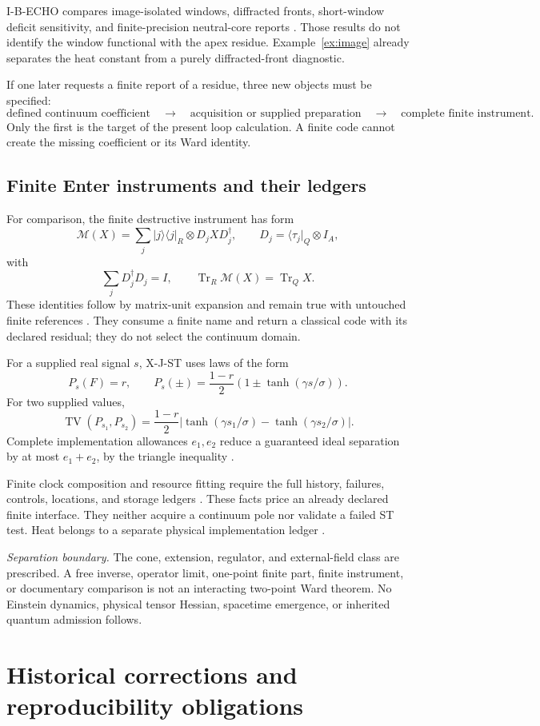 \documentclass[11pt,a4paper]{article}
\newcommand{\abs}[1]{\lvert #1\rvert}
\newcommand{\bra}[1]{\langle #1\rvert}
\newcommand{\proj}[1]{\lvert #1\rangle\langle #1\rvert}
\DeclareMathOperator{\Tr}{Tr}
\DeclareMathOperator{\TV}{TV}
\theoremstyle{plain}
\theoremstyle{definition}
\theoremstyle{remark}
\numberwithin{equation}{section}
\newcommand{\separation}{%
\par\smallskip\noindent
\emph{Separation boundary.}
The cone, extension, regulator, and external-field class are prescribed.
A free inverse, operator limit, one-point finite part, finite instrument,
or documentary comparison is not an interacting two-point Ward theorem.
No Einstein dynamics, physical tensor Hessian, spacetime emergence,
or inherited quantum admission follows.
}
\begin{document}
I-B-ECHO compares image-isolated windows, diffracted fronts,
short-window deficit sensitivity, and finite-precision neutral-core
reports \cite{CheungEcho}.
Those results do not identify the window functional with the apex
residue. Example~\ref{ex:image} already separates the heat constant
from a purely diffracted-front diagnostic.

If one later requests a finite report of a residue, three new
objects must be specified:
\[
\text{defined continuum coefficient}
\quad\longrightarrow\quad
\text{acquisition or supplied preparation}
\quad\longrightarrow\quad
\text{complete finite instrument}.
\]
Only the first is the target of the present loop calculation.
A finite code cannot create the missing coefficient or its Ward
identity.

\subsection{Finite Enter instruments and their ledgers}

For comparison, the finite destructive instrument has form
\[
\mathcal M(X)=
\sum_j\proj j_R\otimes D_jXD_j^\dagger,\qquad
D_j=\bra{\tau_j}_Q\otimes I_A,
\]
with
\[
\sum_jD_j^\dagger D_j=I,\qquad
\Tr_R\mathcal M(X)=\Tr_QX.
\]
These identities follow by matrix-unit expansion and remain true
with untouched finite references
\cite{CheungIB,CheungEn09}.
They consume a finite name and return a classical code with its
declared residual; they do not select the continuum domain.

For a supplied real signal \(s\), X-J-ST uses laws of the form
\[
P_s(F)=r,\qquad
P_s(\pm)=\frac{1-r}{2}
 \left(1\pm\tanh(\gamma s/\sigma)\right).
\]
For two supplied values,
\[
\TV(P_{s_1},P_{s_2})
 =\frac{1-r}{2}
 \abs{\tanh(\gamma s_1/\sigma)-\tanh(\gamma s_2/\sigma)}.
\]
Complete implementation allowances \(e_1,e_2\) reduce a guaranteed
ideal separation by at most \(e_1+e_2\), by the triangle inequality
\cite{CheungXJ,CheungEcho}.

Finite clock composition and resource fitting require the full
history, failures, controls, locations, and storage ledgers
\cite{CheungXK}. These facts price an already declared finite
interface. They neither acquire a continuum pole nor validate
a failed ST test.
Heat belongs to a separate physical implementation ledger
\cite{CheungIC,ReebWolf}.
\separation

\section{Historical corrections and reproducibility obligations}
\label{sec:repro}
\end{document}

